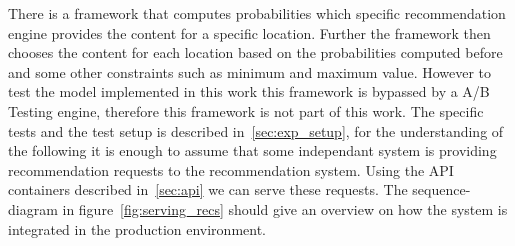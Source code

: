 
There is a framework that computes probabilities which specific recommendation engine provides the content for a specific location.
Further the framework then chooses the content for each location based on the probabilities computed before and some other constraints such as minimum and maximum value.
However to test the model implemented in this work this framework is bypassed by a A/B Testing engine, therefore this framework is not part of this work.
The specific tests and the test setup is described in~\ref{sec:exp_setup}, for the understanding of the following it is enough to assume that some independant system is providing recommendation requests to the recommendation system.
Using the API containers described in~\ref{sec:api} we can serve these requests.
The sequence-diagram in figure~\ref{fig:serving_recs} should give an overview on how the system is integrated in the production environment.

